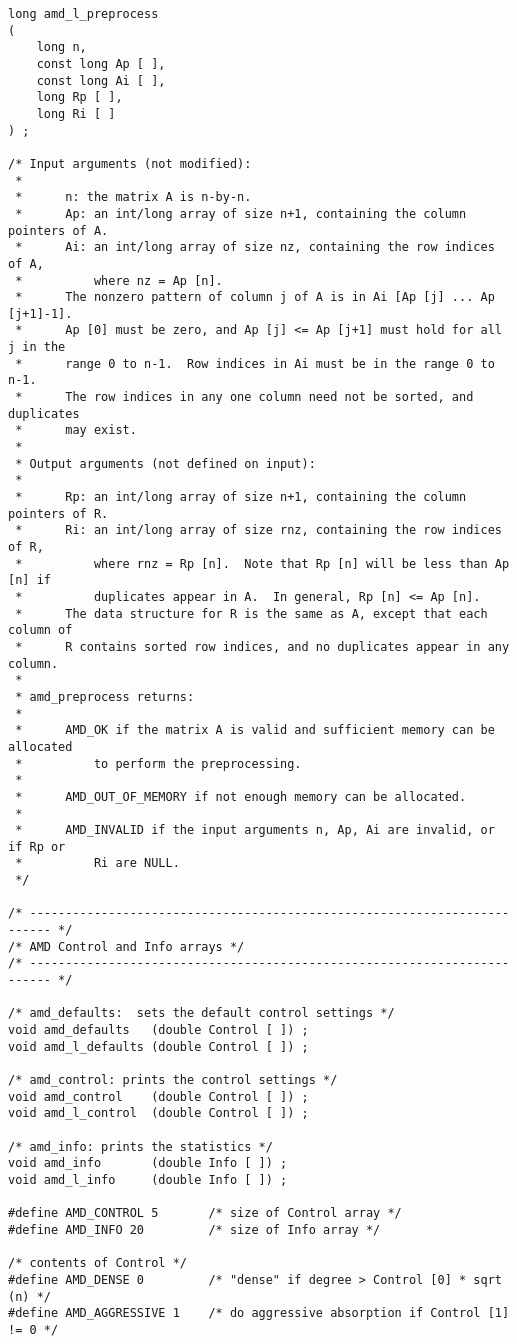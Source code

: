 \documentclass[11pt]{article}
\begin{document}
{\begin{verbatim}
long amd_l_preprocess
(
    long n,
    const long Ap [ ],
    const long Ai [ ],
    long Rp [ ],
    long Ri [ ]
) ;

/* Input arguments (not modified):
 *
 *      n: the matrix A is n-by-n.
 *      Ap: an int/long array of size n+1, containing the column pointers of A.
 *      Ai: an int/long array of size nz, containing the row indices of A,
 *          where nz = Ap [n].
 *      The nonzero pattern of column j of A is in Ai [Ap [j] ... Ap [j+1]-1].
 *      Ap [0] must be zero, and Ap [j] <= Ap [j+1] must hold for all j in the
 *      range 0 to n-1.  Row indices in Ai must be in the range 0 to n-1.
 *      The row indices in any one column need not be sorted, and duplicates
 *      may exist.
 *
 * Output arguments (not defined on input):
 *
 *      Rp: an int/long array of size n+1, containing the column pointers of R.
 *      Ri: an int/long array of size rnz, containing the row indices of R,
 *          where rnz = Rp [n].  Note that Rp [n] will be less than Ap [n] if
 *          duplicates appear in A.  In general, Rp [n] <= Ap [n].
 *      The data structure for R is the same as A, except that each column of
 *      R contains sorted row indices, and no duplicates appear in any column.
 *
 * amd_preprocess returns:
 *
 *      AMD_OK if the matrix A is valid and sufficient memory can be allocated
 *          to perform the preprocessing.
 *
 *      AMD_OUT_OF_MEMORY if not enough memory can be allocated.
 *
 *      AMD_INVALID if the input arguments n, Ap, Ai are invalid, or if Rp or
 *          Ri are NULL.
 */

/* ------------------------------------------------------------------------- */
/* AMD Control and Info arrays */
/* ------------------------------------------------------------------------- */

/* amd_defaults:  sets the default control settings */
void amd_defaults   (double Control [ ]) ;
void amd_l_defaults (double Control [ ]) ;

/* amd_control: prints the control settings */
void amd_control    (double Control [ ]) ;
void amd_l_control  (double Control [ ]) ;

/* amd_info: prints the statistics */
void amd_info       (double Info [ ]) ;
void amd_l_info     (double Info [ ]) ;

#define AMD_CONTROL 5       /* size of Control array */
#define AMD_INFO 20         /* size of Info array */

/* contents of Control */
#define AMD_DENSE 0         /* "dense" if degree > Control [0] * sqrt (n) */
#define AMD_AGGRESSIVE 1    /* do aggressive absorption if Control [1] != 0 */


\end{verbatim}}
\end{document}
